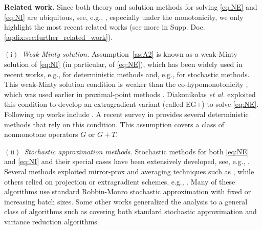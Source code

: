 \documentclass{article}
\theoremstyle{plain}
\theoremstyle{definition}
\theoremstyle{remark}
\begin{document}
\textbf{Related work.}
Since both theory and solution methods for solving \eqref{eq:NE} and \eqref{eq:NI} are ubiquitous, see, e.g., \cite{Bauschke2011,reginaset2008,Facchinei2003,phelps2009convex,ryu2022large,ryu2016primer}, especially under the monotonicity, we only highlight the most recent related works (see more in Supp. Doc. \ref{apdix:sec:further_related_work}).

\vspace{-0.75ex}
\textit{$\mathrm{(i)}$~Weak-Minty solution.}
Assumption~\ref{as:A2} is known as a weak-Minty solution of \eqref{eq:NI} (in particular, of \eqref{eq:NE}), which has been widely used in recent works, e.g., \cite{bohm2022solving,diakonikolas2021efficient,lee2021fast,pethick2022escaping,tran2023extragradient} for deterministic methods  and, e.g., \cite{lee2021fast,pethick2023solving,tran2022accelerated} for stochastic methods.
This weak-Minty solution condition is weaker than the co-hypomonotonicity \citep{bauschke2020generalized}, which was used earlier in  proximal-point methods \citep{combettes2004proximal}.
Diakonikolas \textit{et al.} exploited this condition to develop an extragradient variant (called EG+) to solve \eqref{eq:NE}.
Following up works include \cite{bohm2022solving,cai2022baccelerated,luo2022last,pethick2022escaping,tran2023extragradient}. 
A recent survey in \cite{tran2023sublinear} provides several deterministic methods that rely on this condition.
This assumption covers a class of nonmonotone operators $G$ or $G+T$. 

\vspace{-0.75ex}
\textit{$\mathrm{(ii)}$~Stochastic approximation methods.}
Stochastic methods for both \eqref{eq:NE} and \eqref{eq:NI} and their special cases have been extensively developed, see, e.g., \cite{juditsky2011solving,kotsalis2022simple,pethick2023solving}.
Several methods exploited mirror-prox and averaging techniques such as \cite{juditsky2011solving,kotsalis2022simple}, while others relied on projection or extragradient schemes, e.g., \cite{cui2021analysis,iusem2017extragradient,kannan2019optimal,pethick2023solving,yousefian2018stochastic}. 
Many of these algorithms use standard Robbin-Monro stochastic approximation with fixed or increasing batch sizes.
Some other works generalized the analysis to a general class of algorithms such as \citep{beznosikov2023stochastic,gorbunov2022stochastic,loizou2021stochastic} covering both standard stochastic approximation and variance reduction algorithms.
\end{document}
